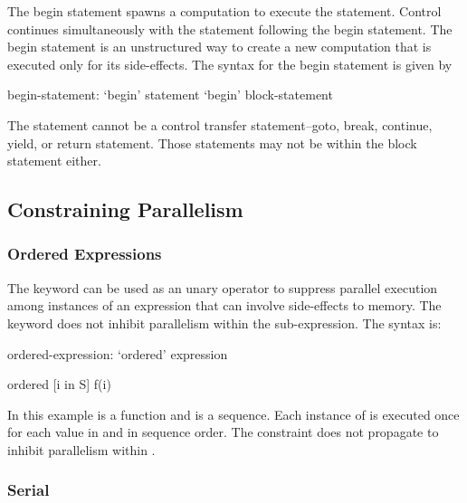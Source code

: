 The begin statement spawns a computation to execute the statement.
Control continues simultaneously with the statement following the
begin statement. The begin statement is an unstructured way to create
a new computation that is executed only for its side-effects. The
syntax for the begin statement is given by
\begin{syntax}
begin-statement:
  `begin' statement
  `begin' block-statement
\end{syntax}

The statement cannot be a control transfer statement--goto, break, 
continue, yield, or return statement. Those statements may not be
within the block statement either.


\subsection{Constraining Parallelism}
\label{Constraining_Parallelism}
\subsubsection{Ordered Expressions}
\label{Ordered_Expressions}

The  keyword can be used as an unary operator to
suppress parallel execution among instances of an expression that can
involve side-effects to memory. The  keyword does not
inhibit parallelism within the sub-expression. The syntax is:
\begin{syntax}
ordered-expression:
   `ordered' expression
\end{syntax}

\begin{example}
\begin{chapel}
ordered [i in S] f(i) 
\end{chapel}
In this example  is a function and  is a
sequence. Each instance of  is executed once for each value
in  and in sequence order. The  constraint does
not propagate to inhibit parallelism within .
\end{example}



\subsubsection{Serial}
\label{Serial}

